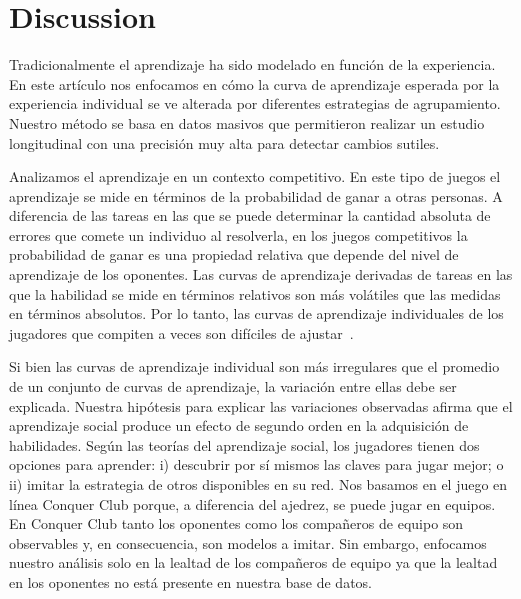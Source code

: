 \documentclass[a4paper,11pt]{book}
\theoremstyle{definition}
\begin{document}
\section{Discussion}

Tradicionalmente el aprendizaje ha sido modelado en funci\'on de la experiencia.
%
En este art\'iculo nos enfocamos en c\'omo la curva de aprendizaje esperada por la experiencia individual se ve alterada por diferentes estrategias de agrupamiento.
%
Nuestro método se basa en datos masivos que permitieron realizar un estudio longitudinal con una precisi\'on muy alta para detectar cambios sutiles.


Analizamos el aprendizaje en un contexto competitivo.
%
En este tipo de juegos el aprendizaje se mide en términos de la probabilidad de ganar a otras personas.
%
A diferencia de las tareas en las que se puede determinar la cantidad absoluta de errores que comete un individuo al resolverla, en los juegos competitivos la probabilidad de ganar es una propiedad relativa que depende del nivel de aprendizaje de los oponentes.
%
Las curvas de aprendizaje derivadas de tareas en las que la habilidad se mide en términos relativos son más volátiles que las medidas en términos absolutos.
%
Por lo tanto, las curvas de aprendizaje individuales de los jugadores que compiten a veces son dif\'iciles de ajustar~\cite{howard2014-learningCurvesChessPlayersATestOfPowerLawGenerality,gaschler2014-playingOffThePredictedLearningCurve}.


Si bien las curvas de aprendizaje individual son más irregulares que el promedio de un conjunto de curvas de aprendizaje, la variaci\'on entre ellas debe ser explicada.
%
Nuestra hip\'otesis para explicar las variaciones observadas afirma que el aprendizaje social produce un efecto de segundo orden en la adquisici\'on de habilidades.
%
Seg\'un las teor\'ias del aprendizaje social, los jugadores tienen dos opciones para aprender: i) descubrir por s\'i mismos las claves para jugar mejor; o ii) imitar la estrategia de otros disponibles en su red.
%
Nos basamos en el juego en l\'inea Conquer Club porque, a diferencia del ajedrez, se puede jugar en equipos.
%
En Conquer Club tanto los oponentes como los compañeros de equipo son observables y, en consecuencia, son modelos a imitar.
%
Sin embargo, enfocamos nuestro análisis solo en la lealtad de los compañeros de equipo ya que la lealtad en los oponentes no está presente en nuestra base de datos.
\end{document}
